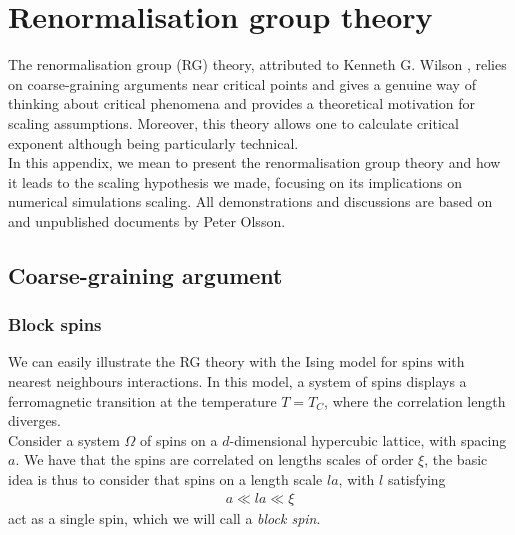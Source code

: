 \documentclass[class=report, float=false, crop=false]{standalone}
\begin{document}
\chapter{Renormalisation group theory}
\label{appendix:rg}

The renormalisation group (RG) theory, attributed to Kenneth G. Wilson \cite{wilson1971renormalization,wilson1974renormalization,wilson1975renormalization}, relies on coarse-graining arguments near critical points and gives a genuine way of thinking about critical phenomena and provides a theoretical motivation for scaling assumptions. Moreover, this theory allows one to calculate critical exponent although being particularly technical.\\

In this appendix, we mean to present the renormalisation group theory and how it leads to the scaling hypothesis we made, focusing on its implications on numerical simulations scaling. All demonstrations and discussions are based on \cite{goldenfeld1992lectures} and unpublished documents by Peter Olsson.

\section{Coarse-graining argument}

\subsection{Block spins}
\label{block_spins}

We can easily illustrate the RG theory with the Ising model for spins with nearest neighbours interactions. In this model, a system of spins displays a ferromagnetic transition at the temperature $T=T_C$, where the correlation length diverges.\\

Consider a system $\Omega$ of spins on a $d$-dimensional hypercubic lattice, with spacing $a$. We have that the spins are correlated on lengths scales of order $\xi$, the basic idea is thus to consider that spins on a length scale $la$, with $l$ satisfying
\begin{align*}
a \ll la \ll \xi
\end{align*}
act as a single spin, which we will call a \textit{block spin}.\\
\end{document}

